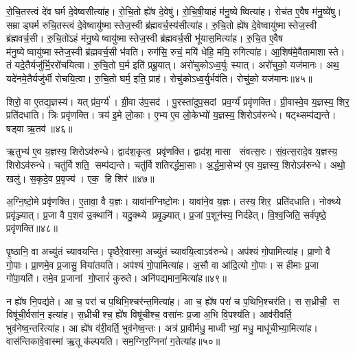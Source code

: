 रो॒चि॒तस्त्वं दे॑व घर्म दे॒वेष्वसीत्या॑ह। 
रो॒चि॒तो ह्ये॑ष दे॒वेषु॑। 
रो॒चि॒षी॒याहं म॑नु॒ष्येष्वित्या॑ह। 
रोच॑त ए॒वैष म॑नु॒ष्ये॑षु। 
सम्राड्घर्म रुचि॒तस्त्वं दे॒वेष्वायु॑ष्मास्तेज॒स्वी ब्र॑ह्मवर्च॒स्य॑सीत्या॑ह। 
रु॒चि॒तो ह्ये॑ष दे॒वेष्वायु॑ष्मास्तेज॒स्वी ब्र॑ह्मवर्च॒सी। 
रु॒चि॒तो॑ऽहं म॑नु॒ष्येष्वायु॑ष्मास्तेज॒स्वी ब्र॑ह्मवर्च॒सी भू॑यास॒मित्या॑ह। 
रु॒चि॒त ए॒वैष म॑नु॒ष्येष्वायु॑ष्मास्तेज॒स्वी ब्र॑ह्मवर्च॒सी भ॑वति। 
रुग॑सि॒ रुचं॒ मयि॑ धेहि॒ मयि॒ रुगित्या॑ह। 
आ॒शिष॑मे॒वैतामाशास्ते। 
तं यदे॒तैर्यजु॑र्भि॒ररो॑चयित्वा। 
रु॒चि॒तो घ॒र्म इति॑ प्रब्रू॒यात्। 
अरो॑चुकोऽध्व॒र्युः स्यात्। 
अरो॑चुको॒ यज॑मानः। 
अथ॒ यदे॑नमे॒तैर्यजु॑र्भी रोचयि॒त्वा। 
रु॒चि॒तो घर्म॒ इति॒ प्राह॑। 
रोचु॑कोऽध्व॒र्युर्भव॑ति। 
रोचु॑को॒ यज॑मानः॥४५॥
\anuvakamend[प॒श्चाद्रो॑चयति॒ जाग॑तेन॒ छन्द॑सा॒ पाङ्क्ते॑न॒ छन्द॑सा॒ समा॑रुचि॒तो रो॑च॒येत्या॑हा॒शिष॑मे॒वैतामाशास्ते शास्ते॒ऽष्टौ च॑]

शिरो॒ वा ए॒तद्य॒ज्ञस्य॑। 
यत् प्र॑व॒र्ग्य॑। 
ग्री॒वा उ॑प॒सद॑। 
पु॒रस्ता॑दुप॒सदां प्रव॒र्ग्यं॑ प्रवृ॑णक्ति। 
ग्री॒वास्वे॒व य॒ज्ञस्य॒ शिर॒ प्रति॑दधाति। 
त्रिः प्रवृ॑णक्ति। 
त्रय॑ इ॒मे लो॒काः। 
ए॒भ्य ए॒व लो॒केभ्यो॑ य॒ज्ञस्य॒ शिरोऽव॑रुन्धे। 
षट्थ्सम्प॑द्यन्ते। 
षड्वा ऋ॒तव॑॥४६॥

ऋ॒तुभ्य॑ ए॒व य॒ज्ञस्य॒ शिरोऽव॑रुन्धे। 
द्वाद॑श॒कृत्व॒ प्रवृ॑णक्ति। 
द्वाद॑श॒ मासा संवत्स॒रः। 
सं॒व॒त्स॒रादे॒व य॒ज्ञस्य॒ शिरोऽव॑रुन्धे। 
चतु॑र्विशति॒ सम्प॑द्यन्ते। 
चतु॑र्विशतिरर्द्धमा॒साः। 
अ॒र्द्ध॒मा॒सेभ्य॑ ए॒व य॒ज्ञस्य॒ शिरोऽव॑रुन्धे। 
अथो॒ खलु॑। 
स॒कृदे॒व प्र॒वृज्य॑। 
एक॒ हि शिर॑॥४७॥

अ॒ग्नि॒ष्टो॒मे प्रवृ॑णक्ति। 
ए॒तावा॒\an{} वै य॒ज्ञः। 
यावा॑नग्निष्टो॒मः। 
यावा॑ने॒व य॒ज्ञः। 
तस्य॒ शिर॒ प्रति॑दधाति। 
नोक्थ्ये प्रवृ॑ञ्ज्यात्। 
प्र॒जा वै प॒शव॑ उ॒क्थानि॑। 
यदु॒क्थ्ये प्रवृ॒ञ्ज्यात्। 
प्र॒जां प॒शून॑स्य॒ निर्द॑हेत्। 
वि॒श्व॒जिति॒ सर्व॑पृष्ठे॒ प्रवृ॑णक्ति॥४८॥

पृ॒ष्ठानि॒ वा अच्यु॑तं च्यावयन्ति। 
पृ॒ष्ठैरे॒वास्मा॒ अच्यु॑तं च्यावयि॒त्वाऽव॑रुन्धे। 
अप॑श्यं गो॒पामित्या॑ह। 
प्रा॒णो वै गो॒पाः। 
प्रा॒णमे॒व प्र॒जासु॒ विया॑तयति। 
अप॑श्यं गो॒पामित्या॑ह। 
अ॒सौ वा आ॑दि॒त्यो गो॒पाः। 
स हीमाः प्र॒जा गो॑पा॒यति॑। 
तमे॒व प्र॒जानां गो॒प्तारं॑ कुरुते। 
अनि॑पद्यमान॒मित्या॑ह॥४९॥

न ह्ये॑ष नि॒पद्य॑ते। 
आ च॒ परा॑ च प॒थिभि॒श्चर॑न्त॒मित्या॑ह। 
आ च॒ ह्ये॑ष परा॑ च प॒थिभि॒श्चर॑ति। 
स स॒ध्रीची॒ स विषू॑ची॒र्वसा॑न॒ इत्या॑ह। 
स॒ध्रीचीश्च॒ ह्ये॑ष विषू॑चीश्च॒ वसा॑नः प्र॒जा अ॒भि वि॒पश्य॑ति। 
आव॑रीवर्ति॒ भुव॑नेष्व॒न्तरित्या॑ह। 
आ ह्ये॑ष व॑री॒वर्ति॒ भुव॑नेष्व॒न्तः। 
अत्र॑ प्रा॒वीर्मधु॒ माध्वीभ्यां॒ मधु॒ माधू॑चीभ्या॒मित्या॑ह। 
वास॑न्तिकावे॒वास्मा॑ ऋ॒तू क॑ल्पयति। 
सम॒ग्निर॒ग्निना॑ ग॒तेत्या॑ह॥५०॥

